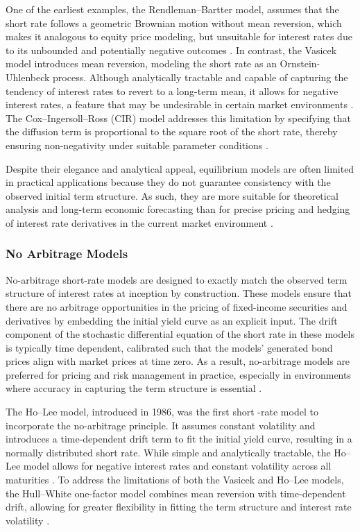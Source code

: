 One of the earliest examples, the Rendleman–Bartter model, assumes that the short rate follows a geometric Brownian motion without mean reversion, which makes it analogous to equity price modeling, but unsuitable for interest rates due to its unbounded and potentially negative outcomes \parencite[p.~708]{hull2015optionsfutures}. In contrast, the Vasicek model introduces mean reversion, modeling the short rate as an Ornstein-Uhlenbeck process. Although analytically tractable and capable of capturing the tendency of interest rates to revert to a long-term mean, it allows for negative interest rates, a feature that may be undesirable in certain market environments \parencite[pp.~708--709]{hull2015optionsfutures}. The Cox–Ingersoll–Ross (CIR) model addresses this limitation by specifying that the diffusion term is proportional to the square root of the short rate, thereby ensuring non-negativity under suitable parameter conditions \parencite[p.~710]{hull2015optionsfutures}.

Despite their elegance and analytical appeal, equilibrium models are often limited in practical applications because they do not guarantee consistency with the observed initial term structure. As such, they are more suitable for theoretical analysis and long-term economic forecasting than for precise pricing and hedging of interest rate derivatives in the current market environment \parencite[pp.~707--714]{hull2015optionsfutures}.

\subsubsection{No Arbitrage Models} \label{no_arbitrage_models}
No-arbitrage short-rate models are designed to exactly match the observed term structure of interest rates at inception by construction. These models ensure that there are no arbitrage opportunities in the pricing of fixed-income securities and derivatives by embedding the initial yield curve as an explicit input. The drift component of the stochastic differential equation of the short rate in these models is typically time dependent, calibrated such that the models' generated bond prices align with market prices at time zero. As a result, no-arbitrage models are preferred for pricing and risk management in practice, especially in environments where accuracy in capturing the term structure is essential \parencite[pp.~714--715]{hull2015optionsfutures}.

The Ho–Lee model, introduced in 1986, was the first short -rate model to incorporate the no-arbitrage principle. It assumes constant volatility and introduces a time-dependent drift term to fit the initial yield curve, resulting in a normally distributed short rate. While simple and analytically tractable, the Ho–Lee model allows for negative interest rates and constant volatility across all maturities \parencite[pp.~715--716]{hull2015optionsfutures}. To address the limitations of both the Vasicek and Ho–Lee models, the Hull–White one-factor model combines mean reversion with time-dependent drift, allowing for greater flexibility in fitting the term structure and interest rate volatility \parencite[pp.~716--718]{hull2015optionsfutures}.

